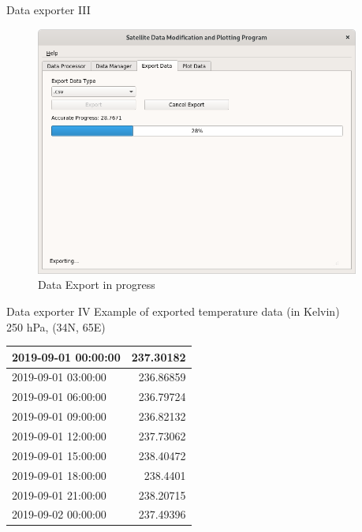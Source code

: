 \documentclass[
    hyperref={
        final,
        colorlinks=true,
        menucolor=black,
        anchorcolor=green,
        linkcolor=blue,
        citecolor=red,
        pdftitle={RS RAS Internship Presentation},
        pdfauthor={Moritz M. Konarski}
    }
]{beamer}
\begin{document}
\begin{frame}{Data exporter III}
\begin{figure}
    \includegraphics[width=0.95\textwidth]{../graphics/de03}
    \vspace{-8pt}
    \caption{Data Export in progress}
\end{figure}
\end{frame}

\begin{frame}{Data exporter IV}
\center
    Example of exported temperature data (in Kelvin) \\
    250 hPa, (34\textdegree{}N, 65\textdegree{}E)\\
    \vspace{5pt}
\begin{tabular}{| l | r |} \hline
    2019-09-01 00:00:00   &  237.30182  \\\hline 
    2019-09-01 03:00:00   &  236.86859  \\\hline
    2019-09-01 06:00:00   &  236.79724  \\\hline
    2019-09-01 09:00:00   &  236.82132  \\\hline
    2019-09-01 12:00:00   &  237.73062  \\\hline
    2019-09-01 15:00:00   &  238.40472  \\\hline
    2019-09-01 18:00:00   &  238.4401   \\\hline
    2019-09-01 21:00:00   &  238.20715  \\\hline
    2019-09-02 00:00:00   &  237.49396  \\\hline
\end{tabular}
\end{frame}
\end{document}
